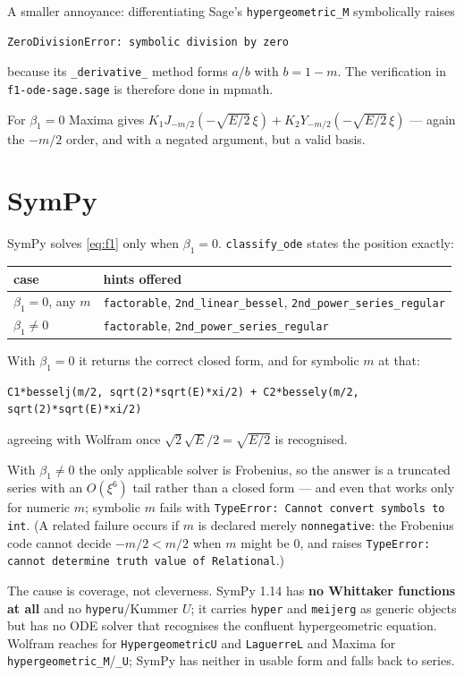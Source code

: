 \documentclass[11pt]{article}
\begin{document}
A smaller annoyance: differentiating Sage's \verb|hypergeometric_M|
symbolically raises
\begin{lstlisting}
ZeroDivisionError: symbolic division by zero
\end{lstlisting}
\noindent because its \verb|_derivative_| method forms $a/b$ with $b=1-m$.
The verification in \verb|f1-ode-sage.sage| is therefore done in mpmath.

For $\beta_1=0$ Maxima gives
$K_1 J_{-m/2}(-\sqrt{E/2}\,\xi) + K_2 Y_{-m/2}(-\sqrt{E/2}\,\xi)$ ---
again the $-m/2$ order, and with a negated argument, but a valid basis.

\section{SymPy}

SymPy solves \eqref{eq:f1} only when $\beta_1=0$.  \verb|classify_ode|
states the position exactly:

\begin{center}
\begin{tabular}{@{}ll@{}}
\toprule
case & hints offered \\
\midrule
$\beta_1=0$, any $m$ & \verb|factorable|, \verb|2nd_linear_bessel|, \verb|2nd_power_series_regular| \\
$\beta_1\neq0$       & \verb|factorable|, \verb|2nd_power_series_regular| \\
\bottomrule
\end{tabular}
\end{center}

\noindent With $\beta_1=0$ it returns the correct closed form, and for
symbolic $m$ at that:
\begin{lstlisting}
C1*besselj(m/2, sqrt(2)*sqrt(E)*xi/2) + C2*bessely(m/2, sqrt(2)*sqrt(E)*xi/2)
\end{lstlisting}
agreeing with Wolfram once $\sqrt2\sqrt E/2 = \sqrt{E/2}$ is recognised.

With $\beta_1\neq0$ the only applicable solver is Frobenius, so the answer
is a truncated series with an $O(\xi^6)$ tail rather than a closed form ---
and even that works only for numeric $m$; symbolic $m$ fails with
\verb|TypeError: Cannot convert symbols to int|.  (A related failure occurs
if $m$ is declared merely \verb|nonnegative|: the Frobenius code cannot
decide $-m/2 < m/2$ when $m$ might be $0$, and raises
\verb|TypeError: cannot determine truth value of Relational|.)

The cause is coverage, not cleverness.  SymPy 1.14 has \textbf{no Whittaker
functions at all} and no \verb|hyperu|/Kummer $U$; it carries \verb|hyper|
and \verb|meijerg| as generic objects but has no ODE solver that recognises
the confluent hypergeometric equation.  Wolfram reaches for
\verb|HypergeometricU| and \verb|LaguerreL| and Maxima for
\verb|hypergeometric_M|/\verb|_U|; SymPy has neither in usable form and
falls back to series.
\end{document}
